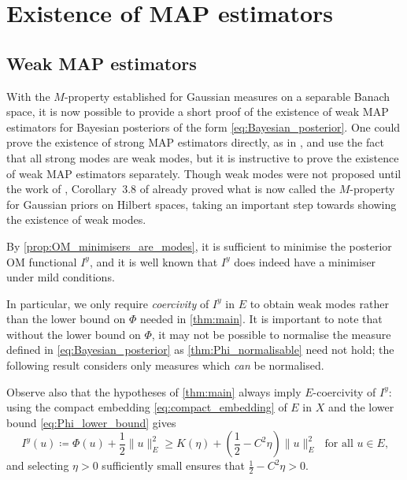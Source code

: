 \documentclass[11pt]{article}
\newcommand*{\defeq}{\coloneqq}
\renewcommand*{\geq}{\geqslant}
\theoremstyle{plain}
\theoremstyle{definition}
\newcommand{\norm}[1]{\lVert #1 \rVert}
\numberwithin{equation}{section}
\numberwithin{figure}{section}
\numberwithin{table}{section}
\begin{document}
\section{Existence of MAP estimators}
\label{sec:map_estimators}

\subsection{Weak MAP estimators}

With the $M$-property established for Gaussian measures on a separable Banach space, it is now possible to provide a short proof of the existence of weak MAP estimators for Bayesian posteriors of the form \eqref{eq:Bayesian_posterior}.
One could prove the existence of strong MAP estimators directly, as in \citet{DashtiLawStuartVoss2013}, and use the fact that all strong modes are weak modes, but it is instructive to prove the existence of weak MAP estimators separately.
Though weak modes were not proposed until the work of \citet{HelinBurger2015}, Corollary~3.8 of \citet{DashtiLawStuartVoss2013} already proved what is now called the $M$-property for Gaussian priors on Hilbert spaces, taking an important step towards showing the existence of weak modes.

By \cref{prop:OM_minimisers_are_modes}, it is sufficient to minimise the posterior OM functional $I^y$, and it is well known that $I^y$ does indeed have a minimiser \citep[see e.g.][Theorem~5.4]{Stuart2010} under mild conditions.

In particular, we only require \emph{coercivity} of $I^y$ in $E$ to obtain weak modes rather than the lower bound on $\Phi$ needed in \cref{thm:main}.
It is important to note that without the lower bound on $\Phi$, it may not be possible to normalise the measure defined in \eqref{eq:Bayesian_posterior} as \cref{thm:Phi_normalisable} need not hold;
the following result considers only measures which \emph{can} be normalised.

Observe also that the hypotheses of \cref{thm:main} always imply $E$-coercivity of $I^{y}$:
using the compact embedding \eqref{eq:compact_embedding} of $E$ in $X$ and the lower bound \eqref{eq:Phi_lower_bound} gives
\begin{equation*}
	I^{y}(u) \defeq \Phi(u) + \frac{1}{2} \norm{u}_{E}^2 \geq K(\eta) + \left(\frac{1}{2} - C^2\eta\right)\norm{u}_{E}^2 \text{~~for all $u \in E$,}
\end{equation*}
and selecting $\eta > 0$ sufficiently small ensures that $\tfrac{1}{2} - C^2 \eta > 0$.
\end{document}

